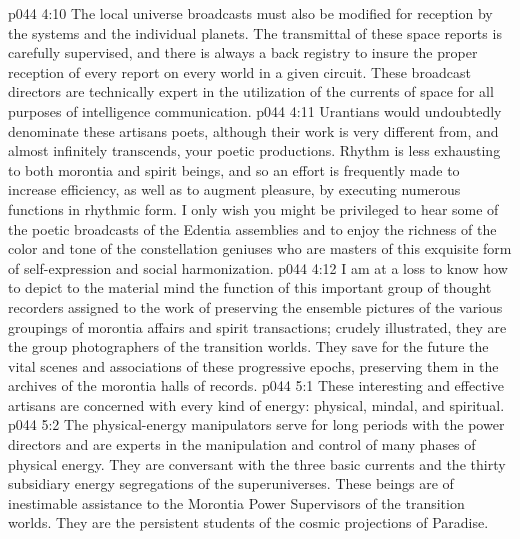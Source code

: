 \vs p044 4:10 The local universe broadcasts must also be modified for reception by the systems and the individual planets. The transmittal of these space reports is carefully supervised, and there is always a back registry to insure the proper reception of every report on every world in a given circuit. These broadcast directors are technically expert in the utilization of the currents of space for all purposes of intelligence communication.
\pc \vs p044 4:11 \bibnobreakspace {} Urantians would undoubtedly denominate these artisans poets, although their work is very different from, and almost infinitely transcends, your poetic productions. Rhythm is less exhausting to both morontia and spirit beings, and so an effort is frequently made to increase efficiency, as well as to augment pleasure, by executing numerous functions in rhythmic form. I only wish you might be privileged to hear some of the poetic broadcasts of the Edentia assemblies and to enjoy the richness of the color and tone of the constellation geniuses who are masters of this exquisite form of self\hyp{}expression and social harmonization.
\pc \vs p044 4:12 \bibnobreakspace {} I am at a loss to know how to depict to the material mind the function of this important group of thought recorders assigned to the work of preserving the ensemble pictures of the various groupings of morontia affairs and spirit transactions; crudely illustrated, they are the group photographers of the transition worlds. They save for the future the vital scenes and associations of these progressive epochs, preserving them in the archives of the morontia halls of records.
%
\vs p044 5:1 These interesting and effective artisans are concerned with every kind of energy: physical, mindal, and spiritual.
\pc \vs p044 5:2 \bibnobreakspace {} The physical\hyp{}energy manipulators serve for long periods with the power directors and are experts in the manipulation and control of many phases of physical energy. They are conversant with the three basic currents and the thirty subsidiary energy segregations of the superuniverses. These beings are of inestimable assistance to the Morontia Power Supervisors of the transition worlds. They are the persistent students of the cosmic projections of Paradise.
